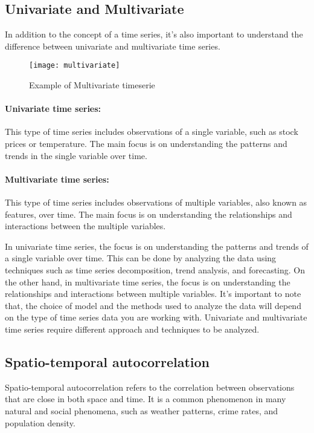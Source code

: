 \subsection{Univariate and Multivariate}

In addition to the concept of a time series, it's also important to understand the difference between univariate and multivariate time series.
\begin{figure}[H]
  \centering
  \texttt{[image: multivariate]}
  \caption{Example of Multivariate timeserie \cite{mltech}}
\end{figure}

\paragraph{Univariate time series:} This type of time series includes observations of a single variable, such as stock prices or temperature. The main focus is on understanding the patterns and trends in the single variable over time.
\paragraph{Multivariate time series:} This type of time series includes observations of multiple variables, also known as features, over time. The main focus is on understanding the relationships and interactions between the multiple variables.

In univariate time series, the focus is on understanding the patterns and trends of a single variable over time. This can be done by analyzing the data using techniques such as time series decomposition, trend analysis, and forecasting.
On the other hand, in multivariate time series, the focus is on understanding the relationships and interactions between multiple variables. 
It's important to note that, the choice of model and the methods used to analyze the data will depend on the type of time series data you are working with. Univariate and multivariate time series require different approach and techniques to be analyzed.

\subsection{Spatio-temporal autocorrelation}
Spatio-temporal autocorrelation refers to the correlation between observations that are close in both space and time. It is a common phenomenon in many natural and social phenomena, such as weather patterns, crime rates, and population density.

